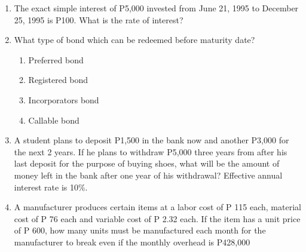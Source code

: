 \documentclass[11pt,a4paper]{article}
\begin{document}
\begin{enumerate}
\item{The exact simple interest of P5,000 invested from June 21, 1995 to December 25, 1995 is P100. What is the rate of interest?}
\\
\item{What type of bond which can be redeemed before maturity date?}
\begin{enumerate}[label=\Alph*.]
\item{Preferred bond}
\item{Registered bond}
\item{Incorporators bond}
\item{Callable bond}
\end{enumerate}
\item{A student plans to deposit P1,500 in the bank now and another P3,000 for the next 2 years. If he plans to withdraw P5,000 three years from after his last deposit for the purpose of buying shoes, what will be the amount of money left in the bank after one year of his withdrawal? Effective annual interest rate is 10\%.}
\\
\item{A manufacturer produces certain items at a labor cost of P 115 each, material cost of P 76 each and variable cost of P 2.32 each. If the item has a unit price of P 600, how many units must be manufactured each month for the manufacturer to break even if the monthly overhead is P428,000}
\\
\end{enumerate}
\end{document}
